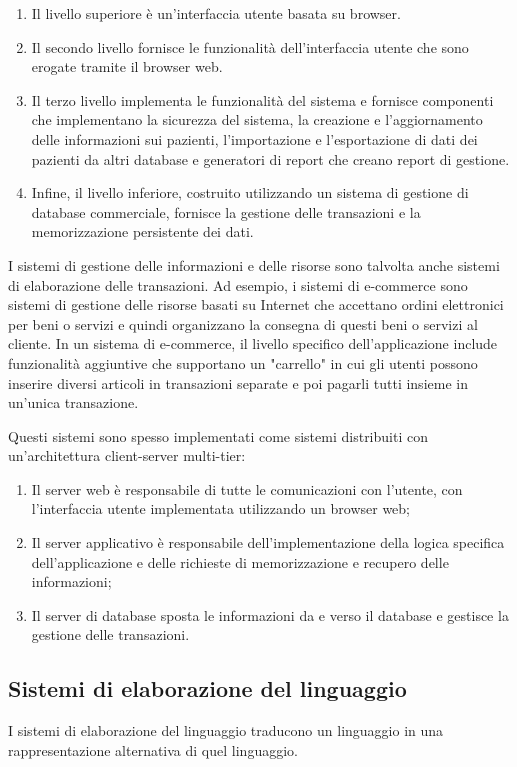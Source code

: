 \begin{enumerate}
    \item Il livello superiore è un'interfaccia utente basata su browser.
    \item Il secondo livello fornisce le funzionalità dell'interfaccia utente che sono erogate tramite il browser web.
    \item Il terzo livello implementa le funzionalità del sistema e fornisce componenti che implementano la sicurezza del sistema, la creazione e l'aggiornamento delle informazioni sui pazienti, l'importazione e l'esportazione di dati dei pazienti da altri database e generatori di report che creano report di gestione.
    \item Infine, il livello inferiore, costruito utilizzando un sistema di gestione di database commerciale, fornisce la gestione delle transazioni e la memorizzazione persistente dei dati.
\end{enumerate}
I sistemi di gestione delle informazioni e delle risorse sono talvolta anche sistemi di elaborazione delle transazioni. Ad esempio, i sistemi di e-commerce sono sistemi di gestione delle risorse basati su Internet che accettano ordini elettronici per beni o servizi e quindi organizzano la consegna di questi beni o servizi al cliente. In un sistema di e-commerce, il livello specifico dell'applicazione include funzionalità aggiuntive che supportano un "carrello" in cui gli utenti possono inserire diversi articoli in transazioni separate e poi pagarli tutti insieme in un'unica transazione.

Questi sistemi sono spesso implementati come sistemi distribuiti con un'architettura client-server multi-tier:
\begin{enumerate}
    \item Il server web è responsabile di tutte le comunicazioni con l'utente, con l'interfaccia utente implementata utilizzando un browser web;
    \item Il server applicativo è responsabile dell'implementazione della logica specifica dell'applicazione e delle richieste di memorizzazione e recupero delle informazioni;
    \item Il server di database sposta le informazioni da e verso il database e gestisce la gestione delle transazioni.
\end{enumerate}

\subsection{Sistemi di elaborazione del linguaggio}
I sistemi di elaborazione del linguaggio traducono un linguaggio in una rappresentazione alternativa di quel linguaggio.

